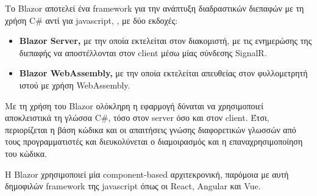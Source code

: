 Το Blazor αποτελεί ένα framework για την ανάπτυξη διαδραστικών διεπαφών με τη χρήση C\# αντί για javascript,
, με δύο εκδοχές:
\begin{itemize}
    \item \textbf{Blazor Server,} με την οποία εκτελείται στον διακομιστή, με τις ενημερώσης της διεπαφής να
            αποστέλλονται στον client μέσω μίας σύνδεσης SignalR.
    \item \textbf{Blazor WebAssembly,} με την οποία εκτελείται απευθείας στον φυλλομετρητή ιστού με χρήση
            WebAssembly. 
\end{itemize}

Με τη χρήση του Blazor ολόκληρη η εφαρμογή δύναται να χρησιμοποιεί αποκλειστικά τη γλώσσα C\#, τόσο στον
server όσο και στον client. Έτσι, περιορίζεται η βάση κώδικα και οι απαιτήσεις γνώσης διαφορετικών γλωσσών 
από τους προγραμματιστές και διευκολύνεται ο διαμοιρασμός και η επαναχρησιμοποίηση του κώδικα.

Η Blazor χρησιμοποιεί μία component-based αρχιτεκρονική, παρόμοια με αυτή δημοφιλών framework της javascript
όπως οι React, Angular και Vue.